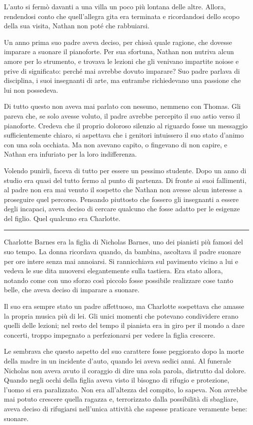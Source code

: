\documentclass[a4paper,oneside,11pt]{memoir}
\begin{document}
L'auto si fermò davanti a una villa un poco più lontana delle altre. Allora,
rendendosi conto che quell'allegra gita era terminata e ricordandosi dello scopo
della sua visita, Nathan non poté che rabbuiarsi.

Un anno prima suo padre aveva deciso, per chissà quale ragione, che dovesse
imparare a suonare il pianoforte. Per sua sfortuna, Nathan non nutriva alcun
amore per lo strumento, e trovava le lezioni che gli venivano impartite noiose e
prive di significato: perché mai avrebbe dovuto imparare? Suo padre parlava di
disciplina, i suoi insegnanti di arte, ma entrambe richiedevano una passione che
lui non possedeva.

Di tutto questo non aveva mai parlato con nessuno, nemmeno con Thomas. Gli
pareva che, se solo avesse voluto, il padre avrebbe percepito il suo astio verso
il pianoforte. Credeva che il proprio doloroso silenzio al riguardo fosse un
messaggio sufficientemente chiaro, si aspettava che i genitori intuissero il suo
stato d'animo con una sola occhiata. Ma non avevano capito, o fingevano di non
capire, e Nathan era infuriato per la loro indifferenza.

Volendo punirli, faceva di tutto per essere un pessimo studente. Dopo un anno di
studio era quasi del tutto fermo al punto di partenza. Di fronte ai suoi
fallimenti, al padre non era mai venuto il sospetto che Nathan non avesse alcun
interesse a proseguire quel percorso. Pensando piuttosto che fossero gli
insegnanti a essere degli incapaci, aveva deciso di cercare qualcuno che fosse
adatto per le esigenze del figlio. Quel qualcuno era Charlotte.

\plainbreak{1}

Charlotte Barnes era la figlia di Nicholas Barnes, uno dei pianisti più famosi
del suo tempo. La donna ricordava quando, da bambina, ascoltava il padre suonare
per ore intere senza mai annoiarsi. Si rannicchiava sul pavimento vicino a lui e
vedeva le sue dita muoversi elegantemente sulla tastiera. Era stato allora,
notando come con uno sforzo così piccolo fosse possibile realizzare cose tanto
belle, che aveva deciso di imparare a suonare.

Il suo era sempre stato un padre affettuoso, ma Charlotte sospettava che amasse
la propria musica più di lei. Gli unici momenti che potevano condividere erano
quelli delle lezioni; nel resto del tempo il pianista era in giro per il mondo a
dare concerti, troppo impegnato a perfezionarsi per vedere la figlia crescere.

Le sembrava che questo aspetto del suo carattere fosse peggiorato dopo la morte
della madre in un incidente d'auto, quando lei aveva sedici anni. Al funerale
Nicholas non aveva avuto il coraggio di dire una sola parola, distrutto dal
dolore. Quando negli occhi della figlia aveva visto il bisogno di rifugio e
protezione, l'uomo si era paralizzato. Non era all'altezza del compito, lo
sapeva. Non avrebbe mai potuto crescere quella ragazza e, terrorizzato dalla
possibilità di sbagliare, aveva deciso di rifugiarsi nell'unica attività che
sapesse praticare veramente bene: suonare.
\end{document}
